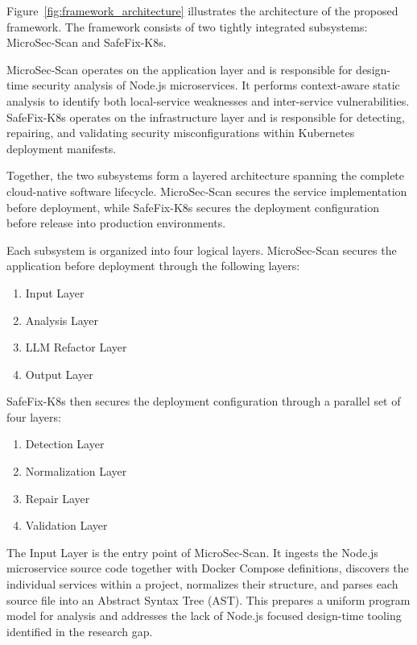 \documentclass[preprint,12pt]{elsarticle}
\newcommand{\new}[1]{#1}
\begin{document}

\new{Figure~\ref{fig:framework_architecture} illustrates the architecture of the
proposed framework. The framework consists of two tightly integrated
subsystems: MicroSec-Scan and SafeFix-K8s.}

\new{MicroSec-Scan operates on the application layer and is responsible for
design-time security analysis of Node.js microservices. It performs
context-aware static analysis to identify both local-service weaknesses and
inter-service vulnerabilities. SafeFix-K8s operates on the infrastructure
layer and is responsible for detecting, repairing, and validating security
misconfigurations within Kubernetes deployment manifests.}

\new{Together, the two subsystems form a layered architecture spanning the
complete cloud-native software lifecycle. MicroSec-Scan secures the service
implementation before deployment, while SafeFix-K8s secures the deployment
configuration before release into production environments.}


\new{Each subsystem is organized into four logical layers. MicroSec-Scan secures
the application before deployment through the following layers:}

\new{
\begin{enumerate}
\item Input Layer
\item Analysis Layer
\item LLM Refactor Layer
\item Output Layer
\end{enumerate}
}

\new{SafeFix-K8s then secures the deployment configuration through a parallel set
of four layers:}

\new{
\begin{enumerate}
\item Detection Layer
\item Normalization Layer
\item Repair Layer
\item Validation Layer
\end{enumerate}
}

\new{The Input Layer is the entry point of MicroSec-Scan. It ingests the Node.js
microservice source code together with Docker Compose definitions, discovers
the individual services within a project, normalizes their structure, and
parses each source file into an Abstract Syntax Tree (AST). This prepares a
uniform program model for analysis and addresses the lack of Node.js focused
design-time tooling identified in the research gap.}
\end{document}
